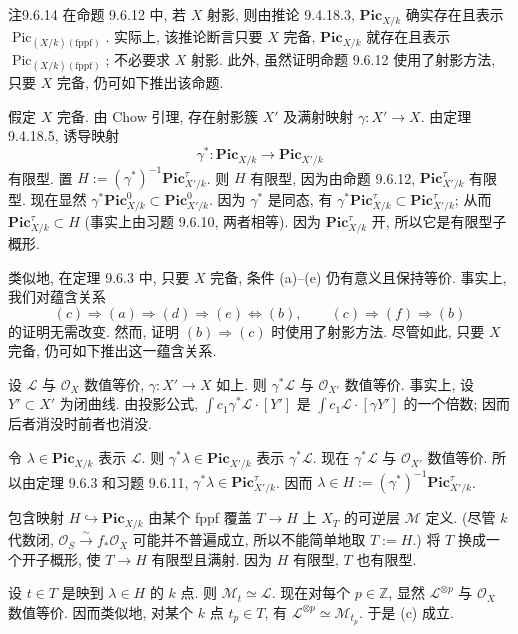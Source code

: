 \begin{origstatement}{注}{9.6.14}\label{ch09s6:rem9614}
在命题 9.6.12 中, 若 $X$ 射影, 则由推论 9.4.18.3, $\mathbf{Pic}_{X/k}$ 确实存在且表示 $\operatorname{Pic}_{(X/k)(\mathrm{fppf})}$. 实际上, 该推论断言只要 $X$ 完备, $\mathbf{Pic}_{X/k}$ 就存在且表示 $\operatorname{Pic}_{(X/k)(\mathrm{fppf})}$; 不必要求 $X$ 射影. 此外, 虽然证明命题 9.6.12 使用了射影方法, 只要 $X$ 完备, 仍可如下推出该命题.

假定 $X$ 完备. 由 Chow 引理, 存在射影簇 $X'$ 及满射映射 $\gamma:X'\to X$. 由定理 9.4.18.5, 诱导映射
\[\gamma^*:\mathbf{Pic}_{X/k}\longrightarrow\mathbf{Pic}_{X'/k}\]
有限型. 置 $H:=(\gamma^*)^{-1}\mathbf{Pic}_{X'/k}^{\tau}$. 则 $H$ 有限型, 因为由命题 9.6.12, $\mathbf{Pic}_{X'/k}^{\tau}$ 有限型. 现在显然 $\gamma^*\mathbf{Pic}_{X/k}^0\subset\mathbf{Pic}_{X'/k}^0$. 因为 $\gamma^*$ 是同态, 有 $\gamma^*\mathbf{Pic}_{X/k}^{\tau}\subset\mathbf{Pic}_{X'/k}^{\tau}$; 从而 $\mathbf{Pic}_{X/k}^{\tau}\subset H$ (事实上由习题 9.6.10, 两者相等). 因为 $\mathbf{Pic}_{X/k}^{\tau}$ 开, 所以它是有限型子概形.

类似地, 在定理 9.6.3 中, 只要 $X$ 完备, 条件 (a)--(e) 仍有意义且保持等价. 事实上, 我们对蕴含关系
\[(c)\Longrightarrow(a)\Longrightarrow(d)\Longrightarrow(e)\Longleftrightarrow(b),\qquad(c)\Longrightarrow(f)\Longrightarrow(b)\]
的证明无需改变. 然而, 证明 $(b)\Rightarrow(c)$ 时使用了射影方法. 尽管如此, 只要 $X$ 完备, 仍可如下推出这一蕴含关系.

设 $\mathcal L$ 与 $\mathcal O_X$ 数值等价, $\gamma:X'\to X$ 如上. 则 $\gamma^*\mathcal L$ 与 $\mathcal O_{X'}$ 数值等价. 事实上, 设 $Y'\subset X'$ 为闭曲线. 由投影公式, $\int c_1\gamma^*\mathcal L\cdot[Y']$ 是 $\int c_1\mathcal L\cdot[\gamma Y']$ 的一个倍数; 因而后者消没时前者也消没.

令 $\lambda\in\mathbf{Pic}_{X/k}$ 表示 $\mathcal L$. 则 $\gamma^*\lambda\in\mathbf{Pic}_{X'/k}$ 表示 $\gamma^*\mathcal L$. 现在 $\gamma^*\mathcal L$ 与 $\mathcal O_{X'}$ 数值等价. 所以由定理 9.6.3 和习题 9.6.11, $\gamma^*\lambda\in\mathbf{Pic}_{X'/k}^{\tau}$. 因而 $\lambda\in H:=(\gamma^*)^{-1}\mathbf{Pic}_{X'/k}^{\tau}$.

包含映射 $H\hookrightarrow\mathbf{Pic}_{X/k}$ 由某个 fppf 覆盖 $T\to H$ 上 $X_T$ 的可逆层 $\mathcal M$ 定义. (尽管 $k$ 代数闭, $\mathcal O_S\xrightarrow\sim f_*\mathcal O_X$ 可能并不普遍成立, 所以不能简单地取 $T:=H$.) 将 $T$ 换成一个开子概形, 使 $T\to H$ 有限型且满射. 因为 $H$ 有限型, $T$ 也有限型.

设 $t\in T$ 是映到 $\lambda\in H$ 的 $k$ 点. 则 $\mathcal M_t\simeq\mathcal L$. 现在对每个 $p\in\mathbb Z$, 显然 $\mathcal L^{\otimes p}$ 与 $\mathcal O_X$ 数值等价. 因而类似地, 对某个 $k$ 点 $t_p\in T$, 有 $\mathcal L^{\otimes p}\simeq\mathcal M_{t_p}$. 于是 (c) 成立.
\end{origstatement}

